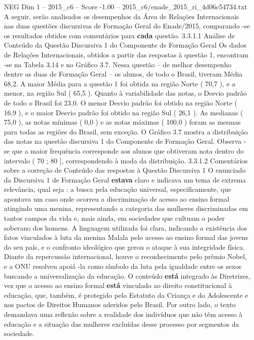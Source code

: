 \begin{textsample}{NEG Dim 1 – 2015\_c6 – Score -1.00 – 2015\_c6/enade\_2015\_ri\_4d06c54734.txt}
A seguir, serão analisados os desempenhos da Área de Relações Internacionais nas duas questões discursivas de Formação Geral do Enade/2015, comparando -se os resultados obtidos com comentários para \textbf{cada} questão. 3.3.1.1 Análise de Conteúdo da Questão Discursiva 1 do Componente de Formação Geral Os dados de Relações Internacionais, obtidos a partir das respostas à questão 1, encontram -se na Tabela 3.14 e no Gráfico 3.7.
Nessa questão – de melhor desempenho dentre as duas de Formação Geral – os alunos, de todo o Brasil, tiveram Média 68,2.
A maior Média para a questão 1 foi obtida na região Norte ( 70,7 ), e a menor, na região Sul ( 65,5 ).
Quanto à variabilidade das notas, o Desvio padrão de todo o Brasil foi 23,0.
O menor Desvio padrão foi obtido na região Norte ( 16,9 ), e o maior Desvio padrão foi obtido na região Sul ( 26,1 ).
As medianas ( 75,0 ), as notas mínimas ( 0,0 ) e as notas máximas ( 100,0 ) foram as mesmas para todas as regiões do Brasil, sem exceção.
O Gráfico 3.7 mostra a distribuição das notas na questão discursiva 1 do Componente de Formação Geral.
Observa -se que a maior frequência corresponde aos alunos que obtiveram nota dentro do intervalo ( 70 ; 80 ], correspondendo à moda da distribuição. 3.3.1.2 Comentários sobre a correção de Conteúdo das respostas à Questão Discursiva 1 O enunciado da Discursiva 1 de Formação Geral \textbf{estava} claro e indicava um tema de extrema relevância, qual seja : a busca pela educação universal, especificamente, que apontava um caso onde ocorreu a discriminação de acesso ao ensino formal atingindo uma menina, representando a categoria das mulheres discriminadas em tantos campos da vida e, mais ainda, em sociedades que cultuam o poder soberano dos homens.
A linguagem utilizada foi clara, indicando a existência dos fatos vinculados à luta da menina Malala pelo acesso ao ensino formal das jovens do seu país, e o confronto ideológico que gerou o ataque à sua integridade física.
Diante da repercussão internacional, houve o reconhecimento pelo prêmio Nobel, e a ONU resolveu apoiá -la como símbolo da luta pela igualdade entre os sexos buscando a universalização da educação.
O conteúdo \textbf{está} integrado às Diretrizes, vez que o acesso ao ensino formal \textbf{está} vinculado ao direito constitucional à educação, que, também, é protegido pelo Estatuto da Criança e do Adolescente e nos pactos de Direitos Humanos aderidos pelo Brasil.
Por outro lado, o texto demandava uma reflexão sobre a realidade dos indivíduos que não têm acesso à educação e a situação das mulheres excluídas desse processo por segmentos da sociedade.

\end{textsample}
